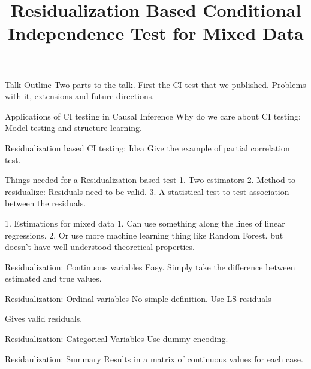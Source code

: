 \documentclass{beamer}
\begin{document}
\title[]{Residualization Based Conditional Independence Test for Mixed Data}
\author {}
\date{}

\maketitle

\begin{frame}{Talk Outline}
	Two parts to the talk. First the CI test that we published.
	Problems with it, extensions and future directions.
\end{frame}

\begin{frame}{Applications of CI testing in Causal Inference}
	Why do we care about CI testing: Model testing and structure learning.
\end{frame}

\begin{frame}{Residualization based CI testing: Idea}
	Give the example of partial correlation test.
\end{frame}

\begin{frame}{Things needed for a Residualization based test}
	1. Two estimators
	2. Method to residualize: Residuals need to be valid.
	3. A statistical test to test association between the residuals.
\end{frame}

\begin{frame}{1. Estimations for mixed data}
	1. Can use something along the lines of linear regressions.
	2. Or use more machine learning thing like Random Forest. but doesn't have 
		well understood theoretical properties.
\end{frame}

\begin{frame}{Residualization: Continuous variables}
	Easy. Simply take the difference between estimated and true values.
\end{frame}

\begin{frame}{Residualization: Ordinal variables}
	No simple definition. Use LS-residuals

	Gives valid residuals.
\end{frame}

\begin{frame}{Residualization: Categorical Variables}
	Use dummy encoding.
\end{frame}

\begin{frame}{Residaulization: Summary}
	Results in a matrix of continuous values for each case.
\end{frame}
\end{document}
